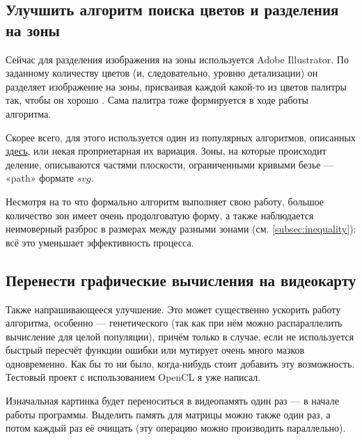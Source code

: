 

\subsection{Улучшить алгоритм поиска цветов и разделения на зоны}\label{subsec:posterisation_and_zoning}

Сейчас для разделения изображения на зоны используется Adobe Illustrator.
По заданному количеству цветов (и, следовательно, уровню детализации) он разделяет изображение на зоны,
присваивая каждой какой-то из цветов палитры так, чтобы он хорошо .
Сама палитра тоже формируется в ходе работы алгоритма.

Скорее всего, для этого используется один из популярных алгоритмов, описанных \href{https://en.wikipedia.org/wiki/Color_quantization}{здесь}, или некая проприетарная их вариация.
Зоны, на которые происходит деление, описываются частями плоскости, ограниченными кривыми безье — «path»  формате $svg$.

Несмотря на то что формально алгоритм выполняет свою работу, большое количество зон имеет очень продолговатую форму,
а также наблюдается неимоверный разброс в размерах между разными зонами (см. \ref{subsec:inequality}):
всё это уменьшает эффективность процесса.


\subsection{Перенести графические вычисления на видеокарту}\label{subsec:move_graphics_to_videocard}
Также напрашивающееся улучшение.
Это может существенно ускорить работу алгоритма, особенно — генетического (так как при нём можно распараллелить вычисление для целой популяции),
причём только в случае, если не используется быстрый пересчёт функции ошибки или мутирует очень много мазков одновременно.
Как бы то ни было, когда-нибудь стоит добавить эту возможность.
Тестовый проект с использованием OpenCL я уже написал.

Изначальная картинка будет переноситься в видеопамять один раз — в начале работы программы.
Выделить память для матрицы можно также один раз, а потом каждый раз её очищать (эту операцию можно производить параллельно).

